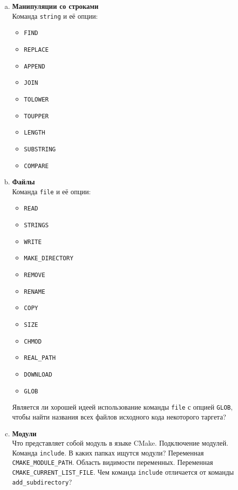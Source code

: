 \documentclass{article}
\begin{document}
\begin{enumerate}
\begin{enumerate}[a.]
\item \textbf{Манипуляции со строками}\\
Команда \texttt{string} и её опции:
\begin{multicols}{3}
\begin{itemize}
\item \texttt{FIND}
\item \texttt{REPLACE}
\item \texttt{APPEND}
\item \texttt{JOIN}
\item \texttt{TOLOWER}
\item \texttt{TOUPPER}
\item \texttt{LENGTH}
\item \texttt{SUBSTRING}
\item \texttt{COMPARE}
\end{itemize}
\end{multicols}

\newpage
\item \textbf{Файлы}\\
Команда \texttt{file} и её опции:
\begin{multicols}{3}
\begin{itemize}
\item \texttt{READ}
\item \texttt{STRINGS}
\item \texttt{WRITE}
\item \texttt{MAKE\_DIRECTORY}
\item \texttt{REMOVE}
\item \texttt{RENAME}
\item \texttt{COPY}
\item \texttt{SIZE}
\item \texttt{CHMOD}
\item \texttt{REAL\_PATH}
\item \texttt{DOWNLOAD}
\item \texttt{GLOB}
\end{itemize}
\end{multicols}
Является ли хорошей идеей использование команды \texttt{file} с опцией \texttt{GLOB}, чтобы найти названия всех файлов исходного кода некоторого таргета?

\item \textbf{Модули}\\
Что представляет собой модуль в языке CMake. Подключение модулей. Команда \texttt{include}. В каких папках ищутся модули? Переменная \texttt{CMAKE\_MODULE\_PATH}. Область видимости переменных. Переменная \texttt{CMAKE\_CURRENT\_LIST\_FILE}. Чем команда \texttt{include} отличается от команды \texttt{add\_subdirectory}?


\end{enumerate}
\end{enumerate}
\end{document}
